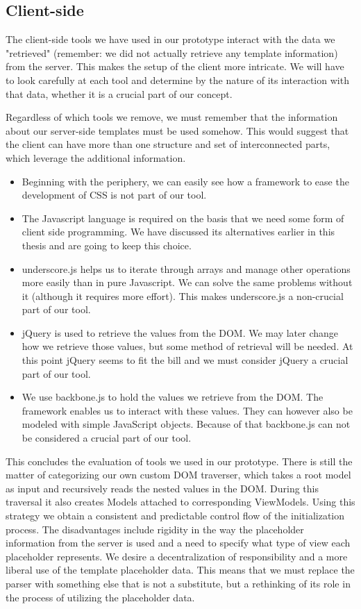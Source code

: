 \subsection{Client-side}
The client-side tools we have used in our prototype interact with the data we
"retrieved" (remember: we did not actually retrieve any template information)
from the server. This makes the setup of the client more intricate. We will have
to look carefully at each tool and determine by the nature of its interaction
with that data, whether it is a crucial part of our concept.

Regardless of which tools we remove, we must remember that the information about
our server-side templates must be used somehow. This would suggest that the
client can have more than one structure and set of interconnected parts, which
leverage the additional information.

\begin{itemize}
\item Beginning with the periphery, we can easily see how a framework to ease
the development of CSS is not part of our tool.
\item The Javascript language is required on the basis that we need some form of
client side programming. We have discussed its alternatives earlier in this
thesis and are going to keep this choice.
\item underscore.js helps us to iterate through arrays and manage other
operations more easily than in pure Javascript. We can solve the same problems
without it (although it requires more effort). This makes underscore.js a
non-crucial part of our tool.
\item jQuery is used to retrieve the values from the DOM. We may later change
how we retrieve those values, but some method of retrieval will be needed.
At this point jQuery seems to fit the bill and we must consider jQuery a crucial
part of our tool.
\item We use backbone.js to hold the values we retrieve from the DOM. The
framework enables us to interact with these values. They can however also be
modeled with simple JavaScript objects. Because of that backbone.js can not be
considered a crucial part of our tool.
\end{itemize}

This concludes the evaluation of tools we used in our prototype. There is
still the matter of categorizing our own custom DOM traverser, which
takes a root model as input and recursively reads the nested values in the DOM.
During this traversal it also creates Models attached to corresponding
ViewModels.
Using this strategy we obtain a consistent and predictable control flow of the
initialization process. The disadvantages include rigidity in the way
the placeholder information from the server is used and a need to specify what
type of view each placeholder represents.
We desire a decentralization of responsibility and a more liberal use of
the template placeholder data. This means that we must replace the parser with
something else that is not a substitute, but a rethinking of its role in the
process of utilizing the placeholder data.

